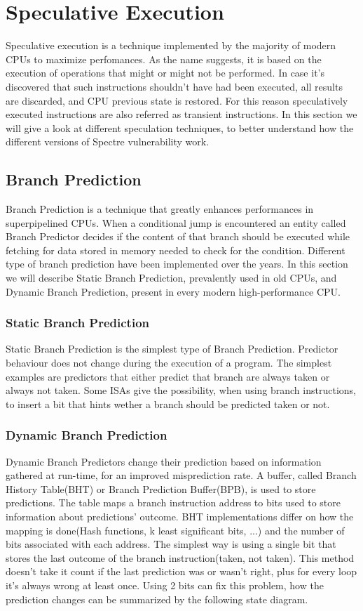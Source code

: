 \section{Speculative Execution}
Speculative execution is a technique implemented by the majority of modern CPUs to maximize perfomances. 
As the name suggests, it is based on the execution of operations that might or might not be performed.
In case it's discovered that such instructions shouldn't have had been executed, all results are discarded, and CPU previous state is restored.
For this reason speculatively executed instructions are also referred as transient instructions.
In this section we will give a look at different speculation techniques, to better understand how the different versions of Spectre vulnerability work.

\subsection{Branch Prediction}
Branch Prediction is a technique that greatly enhances performances in superpipelined CPUs.
When a conditional jump is encountered an entity called Branch Predictor decides if the content of that branch should be executed while fetching for data stored in memory needed to check for the condition.
Different type of branch prediction have been implemented over the years. In this section we will describe Static Branch Prediction, prevalently used in old CPUs, and Dynamic Branch Prediction, present in every modern high-performance CPU.
\subsubsection{Static Branch Prediction}
Static Branch Prediction is the simplest type of Branch Prediction. Predictor behaviour does not change during the execution of a program. The simplest examples are predictors that either predict that branch are always taken or always not taken. Some ISAs give the possibility, when using branch instructions, to insert a bit that hints wether a branch should be predicted taken or not.
\subsubsection{Dynamic Branch Prediction}
Dynamic Branch Predictors change their prediction based on information gathered at run-time, for an improved misprediction rate. A buffer, called Branch History Table(BHT) or Branch Prediction Buffer(BPB), is used to store predictions.
The table maps a branch instruction address to bits used to store information about predictions' outcome. BHT implementations differ on how the mapping is done(Hash functions, k least significant bits, ...) and the number of bits associated with each address. The simplest way is using a single bit that stores the last outcome of the branch instruction(taken, not taken).
This method doesn't take it count if the last prediction was or wasn't right, plus for every loop it's always wrong at least once. Using 2 bits can fix this problem, how the prediction changes can be summarized by the following state diagram.


